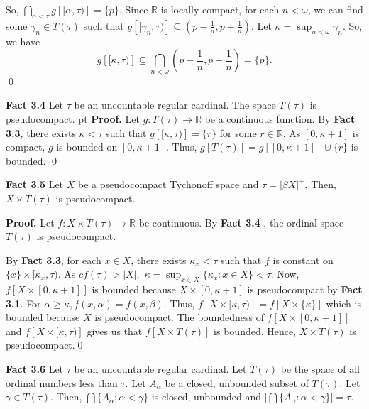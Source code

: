\documentclass{article}
\begin{document}
			  \vskip 10pt

			  So, $\bigcap_{\alpha<\tau} g\left[[\alpha, \tau)\right]=\{p\}$. Since $\mathbb{R}$ is locally compact, for each $n<\omega$, we can find some $\gamma_n\in T(\tau)$ such that $g\left[[\gamma_n,\tau)\right] \subseteq (p-\frac{1}{n}, p+\frac{1}{n}).$ Let $\kappa=\sup_{n<\omega} \gamma_n$. So, we have 
			  $$g\left[[\kappa, \tau)\right] \subseteq \bigcap_{n<\omega} (p-\frac{1}{n}, p+\frac{1}{n})=\{p\}.$$\qed


			  \vskip 40pt

			  \textbf{Fact 3.4} Let $\tau$ be an uncountable regular cardinal. The space $T(\tau)$ is pseudocompact.
			   pt
			  \textbf{Proof.} Let $g: T(\tau) \rightarrow \mathbb{R}$ be a continuous function. 
			  By \textbf{Fact 3.3}, there exists $\kappa <\tau$ such that $g \left[ [\kappa, \tau) \right]=\{r\}$ for some $r\in \mathbb{R}$. As $[0,\kappa +1]$ is compact, $g$ is bounded on $[0,\kappa +1]$. Thus, $g[T(\tau)]=g[[0, \kappa +1]]\cup \{r\}$ is bounded. \qed


			  \vskip 40pt

			  \textbf{Fact 3.5} Let $X$ be a pseudocompact Tychonoff space and $\tau=|\beta X|^+$. Then,  $X\times T(\tau)$ is pseudocompact.
			  \vskip 20pt


			  \textbf{Proof.} Let $f: X\times T(\tau)\rightarrow \mathbb{R}$ be continuous. By \textbf{Fact 3.4} , the ordinal space $T(\tau)$ is pseudocompact.
			  \vskip 10pt 

			  By \textbf{Fact 3.3}, for each $x\in X$, there exists $\kappa_x<\tau$ such that $f$ is constant on $\{x\}\times [\kappa_x, \tau)$. 
			  As $cf(\tau)>|X|,$  $\kappa=\sup_{x\in X} \{\kappa_x: x\in X\}<\tau.$ 
			  Now, $f\left[X\times [0,\kappa+1]\right]$ is bounded because $X\times [0,\kappa+1]$ is pseudocompact by \textbf{Fact 3.1}.
			  For $\alpha\geq \kappa, f(x,\alpha)=f(x,\beta).$ Thus, $f\left[X\times [\kappa,\tau)\right]=f\left[X\times\{\kappa\}\right]$ which is bounded because $X$ is pseudocompact. The boundedness of $f\left[X\times [0,\kappa+1]\right]$ and $f\left[X\times [\kappa,\tau)\right]$ gives us that $f\left[X\times T(\tau)\right]$ is bounded. Hence, $X\times T(\tau)$ is pseudocompact.\qed






			  \vskip 40pt



			  \textbf{Fact 3.6} Let $\tau$ be an uncountable regular cardinal. Let $T(\tau)$ be the space 
			  of all ordinal numbers less than $\tau$. Let $A_\alpha$ be a closed, unbounded subset of $T(\tau)$. Let $\gamma\in T(\tau).$ Then, $\bigcap \{A_\alpha : \alpha<\gamma\}$ is closed, unbounded and $\left| \bigcap \{A_\alpha: \alpha<\gamma\} \right|=\tau$.
\end{document}
